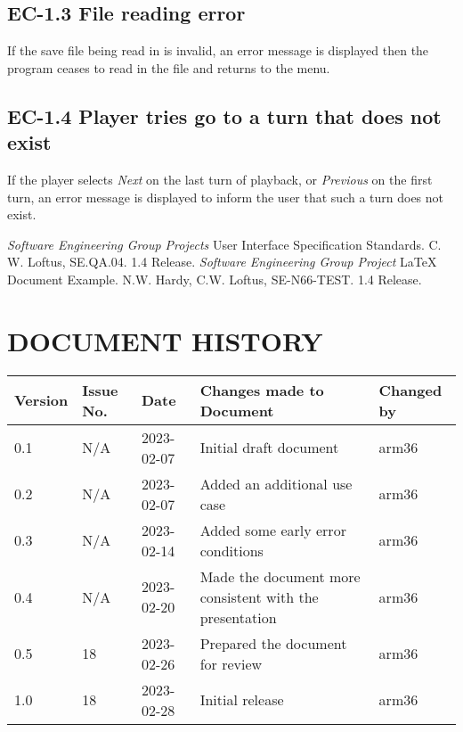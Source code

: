 \documentclass{project}
\begin{document}
\subsection{EC-1.3 File reading error}
If the save file being read in is invalid, an error message is displayed then the program ceases to read in the file and returns to the menu.
\subsection{EC-1.4 Player tries go to a turn that does not exist}
If the player selects \emph{Next} on the last turn of playback, or \emph{Previous} on the first turn, an error message is displayed to inform the user that such a turn does not exist.
\clearpage
{}
\begin{thebibliography}{5}
 \emph{Software Engineering Group Projects}
User Interface Specification Standards.
C. W. Loftus, SE.QA.04. 1.4 Release.
 \emph{Software Engineering Group Project}
LaTeX Document Example.
N.W. Hardy, C.W. Loftus, SE-N66-TEST. 1.4 Release.
\end{thebibliography}
\section*{DOCUMENT HISTORY}
\begin{tabular}{|l | l | l | l | l |}
\hline
Version & Issue No. & Date & Changes made to Document & Changed by \\
\hline
0.1 & N/A & 2023-02-07 & Initial draft document & arm36 \\
\hline
0.2 & N/A & 2023-02-07 & Added an additional use case & arm36 \\
\hline
0.3 & N/A & 2023-02-14 & Added some early error conditions & arm36 \\
\hline
0.4 & N/A & 2023-02-20 & Made the document more consistent with the presentation & arm36 \\
\hline
0.5 & 18 & 2023-02-26 & Prepared the document for review & arm36 \\
\hline
1.0 & 18 & 2023-02-28 & Initial release & arm36 \\
\hline
\end{tabular}
\label{thelastpage}
\end{document}
